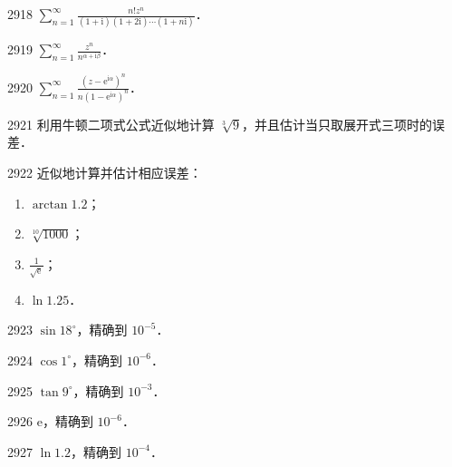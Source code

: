\begin{prob}[S]{2918}
$\displaystyle \sum_{n=1}^{\infty} \frac{n! z^n}{(1 + \mathrm{i})(1 + 2\mathrm{i}) \cdots (1 + n\mathrm{i})}$．
\end{prob}

\begin{prob}[S]{2919}
$\displaystyle \sum_{n=1}^{\infty} \frac{z^n}{n^{\alpha + \mathrm{i}\beta}}$．
\end{prob}

\begin{prob}[S]{2920}
$\displaystyle \sum_{n=1}^{\infty} \frac{(z - \mathrm{e}^{\mathrm{i}\alpha})^n}{n(1 - \mathrm{e}^{\mathrm{i}\alpha})^n}$．
\end{prob}

\begin{prob}[M]{2921}
利用牛顿二项式公式近似地计算 $\sqrt[3]{9}$，并且估计当只取展开式三项时的误差．
\end{prob}

\begin{prob}[L]{2922}
近似地计算并估计相应误差：
\begin{enumerate}[label=(\alph*), itemsep=2pt, topsep=3pt]
  \item $\arctan 1.2$；
  \item $\sqrt[10]{1000}$；
  \item $\displaystyle \frac{1}{\sqrt{\mathrm{e}}}$；
  \item $\ln 1.25$．
\end{enumerate}
\end{prob}


\begin{prob}[S]{2923}
$\sin 18^\circ$，精确到 $10^{-5}$．
\end{prob}

\begin{prob}[S]{2924}
$\cos 1^\circ$，精确到 $10^{-6}$．
\end{prob}

\begin{prob}[S]{2925}
$\tan 9^\circ$，精确到 $10^{-3}$．
\end{prob}

\begin{prob}[S]{2926}
$\mathrm{e}$，精确到 $10^{-6}$．
\end{prob}

\begin{prob}[S]{2927}
$\ln 1.2$，精确到 $10^{-4}$．
\end{prob}

